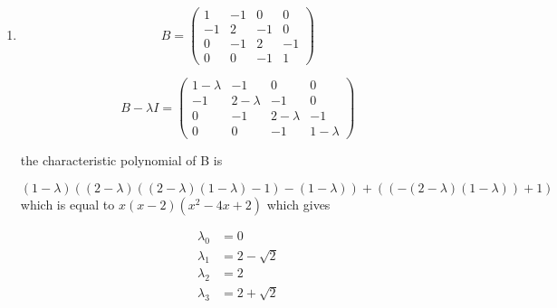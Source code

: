\documentclass{article}
\begin{document}
\begin{enumerate}
  for \(\lambda_1,\) 

  \begin{equation}
    \begin{split}
      v_1 &= \left( 1, -\frac{1}{2}-\frac{\sqrt{5}}{2}, \frac{1}{2}+\frac{\sqrt{5}}{2} , -1 \right)\\
      v_2 &= \left( 1, \frac{1}{2}-\frac{\sqrt{5}}{2}, -\frac{1}{2}+\frac{\sqrt{5}}{2} , 1 \right)\\
      v_3 &= \left( 1, -\frac{1}{2}+\frac{\sqrt{5}}{2}, \frac{1}{2}-\frac{\sqrt{5}}{2} , -1 \right)\\
      v_3 &= \left( 1, \frac{1}{2}+\frac{\sqrt{5}}{2}, -\frac{1}{2}-\frac{\sqrt{5}}{2} , 1 \right)\\
    \end{split}
  \end{equation}
  
  
  \newpage
  \item 
  \begin{equation}
    B = \begin{pmatrix}
    1 & -1 & 0 & 0 \\
    -1 & 2 & -1 & 0 \\
    0 & -1 & 2 & -1 \\
    0 & 0 & -1 & 1
    \end{pmatrix}
  \end{equation}

  \begin{equation}
    B-\lambda I = \begin{pmatrix}
    1-\lambda & -1 & 0 & 0 \\
    -1 & 2-\lambda & -1 & 0 \\
    0 & -1 & 2-\lambda & -1 \\
    0 & 0 & -1 & 1-\lambda
    \end{pmatrix}
  \end{equation}

  the characteristic polynomial of B is 

  \begin{equation}
    (1-\lambda)((2-\lambda)((2-\lambda)(1-\lambda) - 1) -(1-\lambda)) + ((-(2-\lambda)(1-\lambda))+1)
  \end{equation}
  which is equal to \(x(x-2)(x^2-4x+2)\) which gives 

  \begin{equation}
\begin{split}
    \lambda_0 &= 0\\
    \lambda_1  &= 2-\sqrt{2}\\
    \lambda_2 &= 2\\
    \lambda_3 &= 2+\sqrt{2}
\end{split}  \end{equation}


\end{enumerate}
\end{document}

